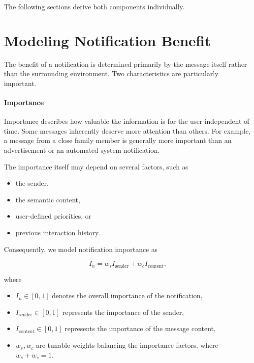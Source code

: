 The following sections derive both components individually.


\section{Modeling Notification Benefit}

The benefit of a notification is determined primarily by the message itself rather than the surrounding environment. Two characteristics are particularly important.

\paragraph{Importance}

Importance describes how valuable the information is for the user independent of time. Some messages inherently deserve more attention than others. For example, a message from a close family member is generally more important than an advertisement or an automated system notification.

The importance itself may depend on several factors, such as

\begin{itemize}
    \item the sender,
    \item the semantic content,
    \item user-defined priorities, or
    \item previous interaction history.
\end{itemize}

Consequently, we model notification importance as

\begin{equation}
I_n
=
w_sI_{\mathrm{sender}}
+
w_cI_{\mathrm{content}},
\label{eq:importance}
\end{equation}

where

\begin{itemize}
    \item $I_n \in [0, 1]$ denotes the overall importance of the notification,
    \item $I_{\mathrm{sender}} \in [0, 1]$ represents the importance of the sender,
    \item $I_{\mathrm{content}} \in [0, 1]$ represents the importance of the message content,
    \item $w_s, w_c$ are tunable weights balancing the importance factors, where $w_s + w_c = 1$.
\end{itemize}

